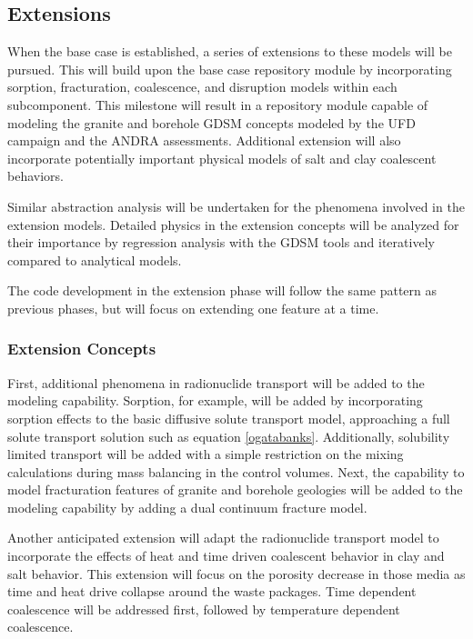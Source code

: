 \subsection{Extensions}


When the base case is established, a series of extensions to these models will 
be pursued.  This will build upon the base case repository module by 
incorporating sorption, fracturation, coalescence, and disruption 
models within each subcomponent.  This milestone will result in a repository 
module capable of modeling the granite and borehole \gls{GDSM} concepts modeled 
by the \gls{UFD} campaign and the \gls{ANDRA} assessments. Additional extension 
will also incorporate potentially important physical models of salt and clay
coalescent behaviors. 

Similar abstraction analysis will be undertaken for the phenomena involved in 
the extension models.  Detailed physics in the extension concepts will be
analyzed for their importance by regression analysis with the \gls{GDSM} 
tools and iteratively compared to analytical models.

The code development in the extension phase will follow the same pattern as 
previous phases, but will focus on extending one feature at a time. 

\subsubsection{Extension Concepts}


    
    First, additional phenomena in radionuclide transport will be added to the 
    modeling capability. Sorption, for example, will be added by incorporating 
    sorption effects to the basic diffusive solute transport model, approaching  
    a full solute transport solution such as equation \eqref{ogatabanks}. 
    Additionally, solubility limited transport will be added with a simple 
    restriction on the mixing calculations during mass balancing in the control 
    volumes. Next, the capability to model fracturation features of granite and
    borehole geologies will be added  to the modeling capability by adding a dual 
    continuum fracture model.  


    Another anticipated extension will adapt the radionuclide transport model 
    to incorporate the effects of heat and time driven coalescent behavior in 
    clay and salt behavior. This extension will focus on the porosity decrease 
    in those media as time and heat drive collapse around the waste packages.  
    Time dependent coalescence will be addressed first, followed by temperature  
    dependent coalescence.

